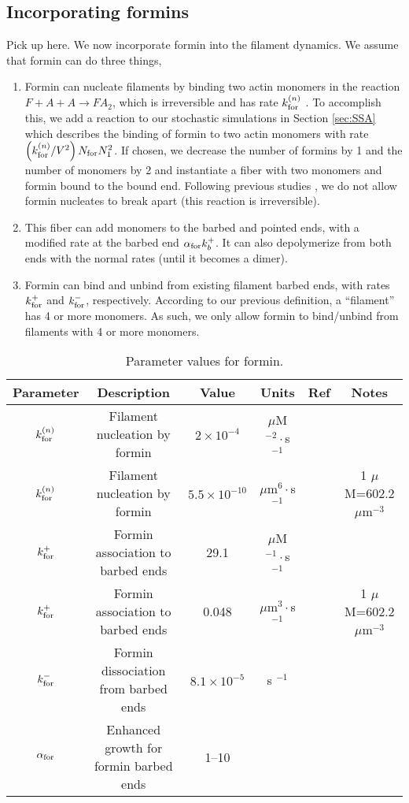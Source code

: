 \documentclass[11pt]{article}
\newcommand{\red}[1]{\color{red}#1\normalcolor}
\begin{document}
\subsection{Incorporating formins}
\red{Pick up here.} We now incorporate formin into the filament dynamics. We assume that formin can do three things,
\begin{enumerate}
\item Formin can nucleate filaments by binding two actin monomers in the reaction $F+A+A \rightarrow FA_2$, which is irreversible and has rate $k_\text{for}^{(n)}$ \cite{paul2008role, zweifel2021nucleation}. To accomplish this, we add a reaction to our stochastic simulations in Section \ref{sec:SSA} which describes the binding of formin to two actin monomers with rate $\left(k_\text{for}^{(n)}/V^2\right)N_\text{for}N_1^2 $. If chosen, we decrease the number of formins by 1 and the number of monomers by 2 and instantiate a fiber with two monomers and formin bound to the bound end. Following previous studies \cite{paul2008role, zweifel2021nucleation}, we do not allow formin nucleates to break apart (this reaction is irreversible). 
\item This fiber can add monomers to the barbed and pointed ends, with a modified rate at the barbed end $\alpha_\text{for} k_b^+$. It can also depolymerize from both ends with the normal rates (until it becomes a dimer).
\item Formin can bind and unbind from existing filament barbed ends, with rates $k_\text{for}^+$ and $k_\text{for}^-$, respectively. According to our previous definition, a ``filament'' has 4 or more monomers. As such, we only allow formin to bind/unbind from filaments with 4 or more monomers.
\end{enumerate}


\begin{table}
\begin{center}
\begin{tabular}{|c|c|c|c|c|c|}\hline
Parameter & Description & Value & Units & Ref & Notes \\ \hline
$k_\text{for}^{(n)}$ & Filament nucleation by formin & $2 \times 10^{-4}$ & $\mu$M$^{-2}\cdot$s$^{-1}$& \cite{paul2008role} & \\ 
$k_\text{for}^{(n)}$ & Filament nucleation by formin & $5.5 \times 10^{-10}$ & $\mu$m$^{6} \cdot$s$^{-1}$ & \cite{paul2008role} & 1 $\mu$M=602.2 $\mu$m$^{-3}$ \\ 
$k_\text{for}^+$ & Formin association to barbed ends& 29.1 & $\mu$M$^{-1} \cdot $s$^{-1}$ & \cite{shekhar2015formin}& \\
$k_\text{for}^+$ & Formin association to barbed ends&0.048 & $\mu$m$^{3} \cdot$s$^{-1}$ & \cite{shekhar2015formin}& 1 $\mu$M=602.2 $\mu$m$^{-3}$ \\
$k_\text{for}^-$ & Formin dissociation from barbed ends& $8.1 \times 10^{-5}$ & s $^{-1}$ & \cite{shekhar2015formin}& \\
$\alpha_\text{for}$ & Enhanced growth for formin barbed ends & 1--10 & & &\\ \hline
\end{tabular}
\caption{\label{tab:paramsF} Parameter values for formin.}
\end{center}
\end{table}
\end{document}
